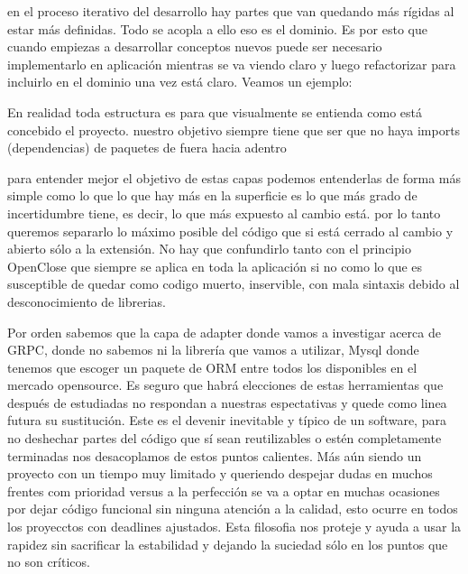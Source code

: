 en el proceso iterativo del desarrollo hay partes que van quedando más rígidas al estar más definidas. Todo se acopla a ello eso es el dominio. Es por esto que cuando empiezas a desarrollar conceptos nuevos puede ser necesario implementarlo en aplicación mientras se va viendo claro y luego refactorizar para incluirlo en el dominio una vez está claro.
Veamos un ejemplo:

\begin{figure}[H]
    
    \caption{}
    \label{fig:ProjectfolderStructure}
\end{figure}

En realidad toda estructura es para que visualmente se entienda como está concebido el proyecto. nuestro objetivo siempre tiene que ser que no haya imports (dependencias) de paquetes de fuera hacia adentro


para entender mejor el objetivo de estas capas podemos entenderlas de forma más simple como lo que lo que hay más en la superficie es lo que más grado de incertidumbre tiene, es decir, lo que más expuesto al cambio está. por lo tanto queremos separarlo lo máximo posible del código que si está cerrado al cambio y abierto sólo a la extensión. No hay que confundirlo tanto con el principio OpenClose que siempre se aplica en toda la aplicación si no como lo que es susceptible de quedar como codigo muerto, inservible, con mala sintaxis debido al desconocimiento de librerias.

Por orden sabemos que la capa de adapter donde vamos a investigar acerca de GRPC, donde no sabemos ni la librería que vamos a utilizar, Mysql donde tenemos que escoger un paquete de ORM entre todos los disponibles en el mercado opensource. Es seguro que habrá elecciones de estas herramientas que después de estudiadas no respondan a nuestras espectativas y quede como linea futura su sustitución. Este es el devenir inevitable y típico de un software, para no deshechar partes del código que sí sean reutilizables o estén completamente terminadas nos desacoplamos de estos puntos calientes. Más aún siendo un proyecto con un tiempo muy limitado y queriendo despejar dudas en muchos frentes com prioridad versus a la perfección se va a optar en muchas ocasiones por dejar código funcional sin ninguna atención a la calidad, esto ocurre en todos los proyecctos con deadlines ajustados. Esta filosofia nos proteje y ayuda a usar la rapidez sin sacrificar la estabilidad y dejando la suciedad sólo en los puntos que no son críticos.


